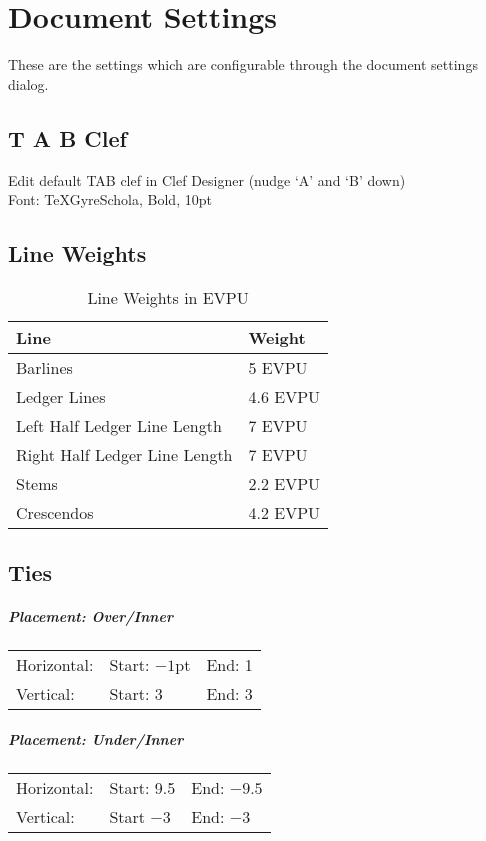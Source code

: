 \documentclass[]{memoir}
\begin{document}
\chapter{Document Settings}
These are the settings which are configurable through the
document settings dialog.
\section{T A B Clef}
Edit default TAB clef in Clef Designer (nudge `A' and 	`B' down)\\
Font: TeXGyreSchola, Bold, 10pt
\section{Line Weights}
\begin{table}
  \begin{center}
\begin{tabular}[h!]{l l}
  Line & Weight\\\hline
  Barlines & 5 EVPU\\
  Ledger Lines & 4.6 EVPU\\
  Left Half Ledger Line Length & 7 EVPU\\
  Right Half Ledger Line Length & 7 EVPU\\
  Stems & 2.2 EVPU\\
  Crescendos & 4.2 EVPU\\
\end{tabular}
\end{center}
\caption{Line Weights in EVPU}
\end{table}
\section{Ties}
\paragraph{Placement: Over/Inner}
\begin{tabular}{l l l}
Horizontal: & Start: $-1$pt & End: 1\\
Vertical: & Start: 3 & End: 3\\
\end{tabular}
\paragraph{Placement: Under/Inner}
\begin{tabular}{l l l}
Horizontal: & Start: 9.5 & End: $-9.5$\\
Vertical: & Start $-3$ & End: $-3$
\end{tabular}
\end{document}
